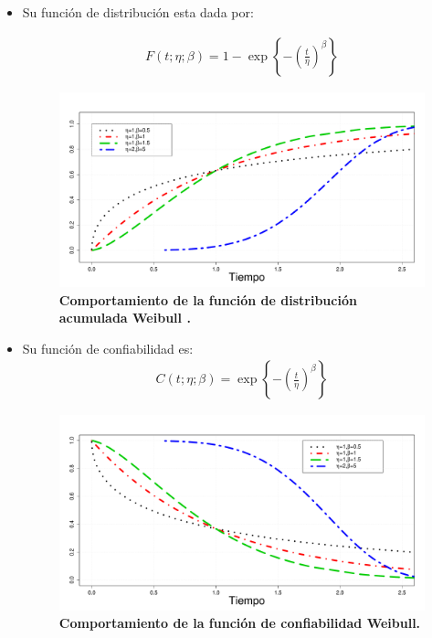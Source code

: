 \begin{itemize}
\item Su funci\'on de distribuci\'on esta dada por:

\begin{eqnarray*}
F(t;\eta;\beta)=1-\exp\left\{-\left(\frac{t}{\eta}\right)^{\beta}\right\}
\end{eqnarray*}

\begin{figure}
\begin{center}
\includegraphics[scale=0.35]{weA.pdf}
\end{center}
\vspace{-1cm}\caption{\bf Comportamiento de la  funci\'on de distribuci\'on acumulada Weibull .}\label{wea}
\end{figure}


\item Su funci\'on de confiabilidad es:
\begin{eqnarray*}
C(t;\eta;\beta)=\exp\left\{-\left(\frac{t}{\eta}\right)^{\beta}\right\}
\end{eqnarray*}

\begin{figure}
\begin{center}
\includegraphics[scale=0.35]{weC.pdf}
\end{center}
\vspace{-1cm}\caption{\bf Comportamiento de la funci\'on de confiabilidad Weibull.}\label{wec}
\end{figure}



\end{itemize}
